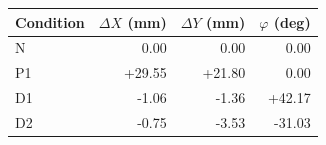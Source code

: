 \begin{tabular}{lrrr}
\toprule
Condition & $\Delta X$ (mm) & $\Delta Y$ (mm) & $\varphi$ (deg) \\
\midrule
N & 0.00 & 0.00 & 0.00 \\
P1 & +29.55 & +21.80 & 0.00 \\
D1 & -1.06 & -1.36 & +42.17 \\
D2 & -0.75 & -3.53 & -31.03 \\
\bottomrule
\end{tabular}
